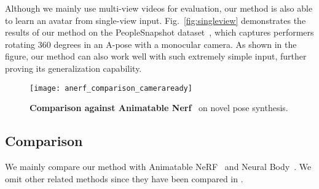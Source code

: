 

Although we mainly use multi-view videos for evaluation, our method is also able to learn an avatar from single-view input. Fig.~\ref{fig:singleview} demonstrates the results of our method on  the PeopleSnapshot dataset~\cite{alldieck2018videoavatar}, which captures performers rotating 360 degrees in an A-pose with a monocular camera. As shown in the figure, our method can also work well with such extremely simple input, further proving its generalization capability. 


\begin{figure}
    \centering
    \texttt{[image: anerf\_comparison\_cameraready]}
    \caption{\textbf{Comparison against Animatable Nerf}~\cite{peng2021animatable_nerf} on novel pose synthesis. }
    \label{fig:anerf_comparison}
\end{figure}




\subsection{Comparison}
We mainly compare our method with Animatable NeRF~\cite{peng2021animatable_nerf} and Neural Body~\cite{peng2021neuralbody}. 
We omit other related methods since they have been compared in \cite{peng2021animatable_nerf}. 

